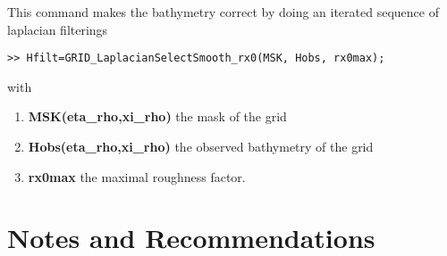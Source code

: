\documentclass[12pt]{article}
\begin{document}
This command makes the bathymetry correct by doing an iterated
sequence of laplacian filterings
\begin{verbatim}
>> Hfilt=GRID_LaplacianSelectSmooth_rx0(MSK, Hobs, rx0max);
\end{verbatim}
with
\begin{enumerate}
\item {\bf MSK(eta\_rho,xi\_rho)} the mask of the grid
\item {\bf Hobs(eta\_rho,xi\_rho)} the observed bathymetry of the grid
\item {\bf rx0max} the maximal roughness factor.
\end{enumerate}



\section{Notes and Recommendations}
\end{document}
